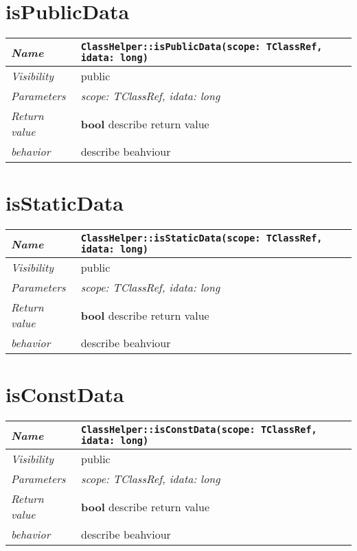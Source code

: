  \section{isPublicData}
\begin{longtable}{p{3cm} @{\hskip 1cm} p{12cm}}
 \hline
\textit{Name} & \texttt{ClassHelper::isPublicData(scope: TClassRef, idata: long)}\\
\hline
 \textit{Visibility} & public\\
\hline
\textit{Parameters} & \textit{scope: TClassRef, idata: long}\\
\hline
\textit{Return value} & \textbf{ bool} describe return value\\
  \hline
 \textit{behavior} & describe beahviour \\
\hline
\end{longtable} \pagebreak
 \section{isStaticData}
\begin{longtable}{p{3cm} @{\hskip 1cm} p{12cm}}
 \hline
\textit{Name} & \texttt{ClassHelper::isStaticData(scope: TClassRef, idata: long)}\\
\hline
 \textit{Visibility} & public\\
\hline
\textit{Parameters} & \textit{scope: TClassRef, idata: long}\\
\hline
\textit{Return value} & \textbf{ bool} describe return value\\
  \hline
 \textit{behavior} & describe beahviour \\
\hline
\end{longtable} \pagebreak
 \section{isConstData}
\begin{longtable}{p{3cm} @{\hskip 1cm} p{12cm}}
 \hline
\textit{Name} & \texttt{ClassHelper::isConstData(scope: TClassRef, idata: long)}\\
\hline
 \textit{Visibility} & public\\
\hline
\textit{Parameters} & \textit{scope: TClassRef, idata: long}\\
\hline
\textit{Return value} & \textbf{ bool} describe return value\\
  \hline
 \textit{behavior} & describe beahviour \\
\hline
\end{longtable} \pagebreak
